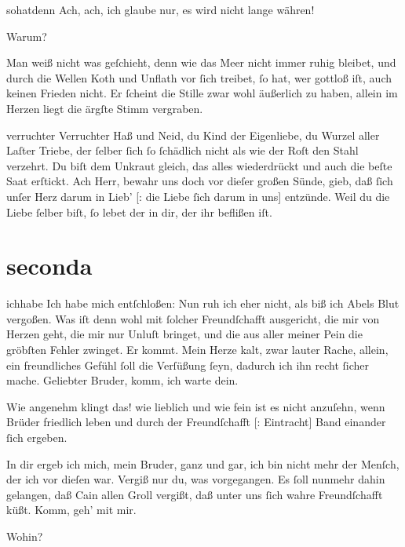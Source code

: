 \documentclass[tocstyle=ref-genre]{ees}
\begin{document}
{\begin{movement}{sohatdenn}
  \voice[Adam]
  Ach, ach, ich glaube nur, es wird nicht lange währen!

  \voice[Eva]
  Warum?

  \voice[Adam]
  Man weiß nicht was geſchieht,
  denn wie das Meer nicht immer ruhig bleibet,
  und durch die Wellen Koth und Unflath vor ſich treibet,
  ſo hat, wer gottloß iſt, auch keinen Frieden nicht.
  Er ſcheint die Stille zwar wohl äußerlich zu haben,
  allein im Herzen liegt die ärgſte Stimm vergraben.
\end{movement}

\begin{movement}{verruchter}
  \voice[Chor]
  Verruchter Haß und Neid, du Kind der Eigenliebe,
  du Wurzel aller Laſter Triebe,
  der ſelber ſich ſo ſchädlich nicht
  als wie der Roſt den Stahl verzehrt.
  Du biſt dem Unkraut gleich, das alles wiederdrückt
  und auch die beſte Saat erſtickt.
  Ach Herr, bewahr uns doch vor dieſer großen Sünde,
  gieb, daß ſich unſer Herz darum in Lieb’ [: die Liebe ſich darum in uns] entzünde.
  Weil du die Liebe ſelber biſt,
  ſo lebet der in dir, der ihr beflißen iſt.
\end{movement}

\part{seconda}

\begin{movement}{ichhabe}
  \voice[Cain]
  Ich habe mich entſchloßen:
  Nun ruh ich eher nicht,
  als biß ich Abels Blut vergoßen.
  Was iſt denn wohl mit ſolcher Freundſchafft ausgericht,
  die mir von Herzen geht, die mir nur Unluſt bringet,
  und die aus aller meiner Pein
  die gröbſten Fehler zwinget.
  Er kommt. Mein Herze kalt, zwar lauter Rache,
  allein,
  ein freundliches Gefühl ſoll die Verſüßung ſeyn,
  dadurch ich ihn recht ſicher mache.
  Geliebter Bruder, komm, ich warte dein.

  \voice[Abel]
  Wie angenehm klingt das! wie lieblich und wie fein
  ist es nicht anzuſehn, wenn Brüder friedlich leben
  und durch der Freundſchafft [: Eintracht] Band einander ſich ergeben.

  \voice[Cain]
  In dir ergeb ich mich, mein Bruder, ganz und gar,
  ich bin nicht mehr der Menſch, der ich vor dieſen war.
  Vergiß nur du, was vorgegangen.
  Es ſoll nunmehr dahin gelangen,
  daß Cain allen Groll vergißt,
  daß unter uns ſich wahre Freundſchafft küßt.
  Komm, geh’ mit mir.

  \voice[Abel]
  Wohin?


\end{movement}}
\end{document}
